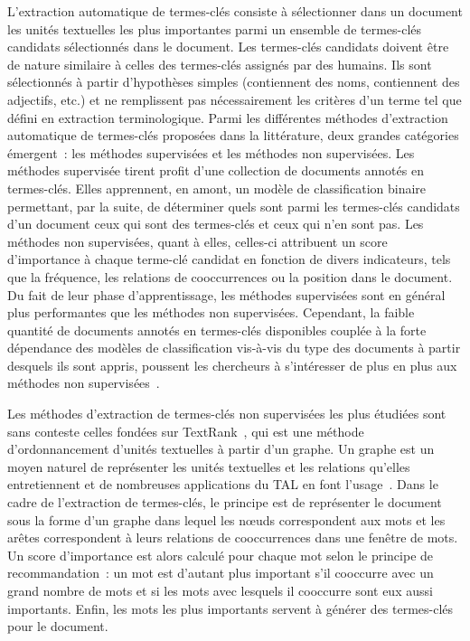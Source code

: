   L'extraction automatique de termes-clés consiste à sélectionner dans un
  document les unités textuelles les plus importantes parmi un ensemble de
  termes-clés candidats sélectionnés dans le document. Les termes-clés candidats
  doivent être de nature similaire à celles des termes-clés assignés par des
  humains. Ils sont sélectionnés à partir d'hypothèses simples (contiennent des
  noms, contiennent des adjectifs, etc.) et ne remplissent pas nécessairement
  les critères d'un terme tel que défini en extraction terminologique. Parmi les
  différentes méthodes d'extraction automatique de termes-clés proposées dans la
  littérature, deux grandes catégories émergent~: les méthodes supervisées et
  les méthodes non supervisées. Les méthodes supervisée tirent profit d'une collection de
  documents annotés en termes-clés. Elles apprennent, en amont, un modèle de
  classification binaire permettant, par la suite, de déterminer quels sont
  parmi les termes-clés candidats d'un document ceux qui sont des termes-clés et
  ceux qui n'en sont pas. Les méthodes non supervisées, quant à elles,
  celles-ci attribuent un score d'importance à chaque terme-clé candidat en
  fonction de divers indicateurs, tels que la fréquence, les relations de
  cooccurrences ou la position dans le document. Du fait de leur phase
  d'apprentissage, les méthodes supervisées sont en général plus performantes
  que les méthodes non supervisées. Cependant, la faible quantité de documents
  annotés en termes-clés disponibles couplée à la forte dépendance des modèles
  de classification vis-à-vis du type des documents à partir desquels ils sont
  appris, poussent les chercheurs à s'intéresser de plus en plus aux méthodes
  non supervisées~\cite{hassan2010conundrums}.

  Les méthodes d'extraction de termes-clés non supervisées les plus étudiées
  sont sans conteste celles fondées sur TextRank~\cite{mihalcea2004textrank}, qui
  est une méthode d'ordonnancement d'unités textuelles à partir d'un graphe. Un
  graphe est un moyen naturel de représenter les unités textuelles et les
  relations qu'elles entretiennent et de nombreuses applications du TAL en font
  l'usage~\cite{kozareva2013textgraphs}. Dans le cadre de l'extraction de
  termes-clés, le principe est de représenter le document sous la forme d'un
  graphe dans lequel les n\oe{}uds correspondent aux mots et les arêtes
  correspondent à leurs relations de cooccurrences dans une fenêtre de mots. Un
  score d'importance est alors calculé pour chaque mot selon le principe de
  recommandation~: un mot est d'autant plus important s'il cooccurre avec un
  grand nombre de mots et si les mots avec lesquels il cooccurre sont eux aussi
  importants. Enfin, les mots les plus importants servent à générer des
  termes-clés pour le document.

